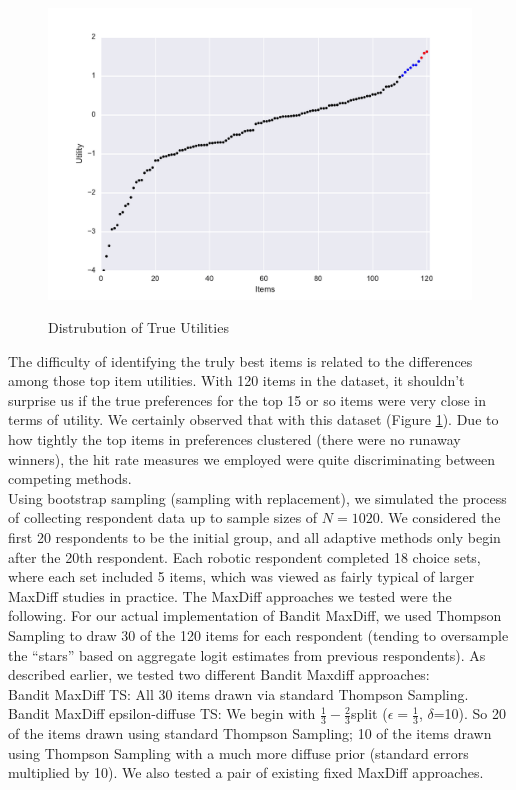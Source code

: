 \documentclass[nonblindrev]{informs3}
\begin{document}
\begin{figure}[!ht]
\caption{Distrubution of True Utilities}
\includegraphics[width=1\textwidth]{plots/utilscore.pdf}
\label{fig:util}
\end{figure}
The difficulty of identifying the truly best items is related to the differences among those top item utilities. With 120 items in the dataset, it shouldn't surprise us if the true preferences for the top 15 or so items were very close in terms of utility.  We certainly observed that with this dataset (Figure \ref{fig:util}).  Due to how tightly the top items in preferences clustered (there were no runaway winners), the hit rate measures we employed were quite discriminating between competing methods.\\
Using bootstrap sampling (sampling with replacement), we simulated the process of collecting respondent data up to sample sizes of $N=1020$.  We considered the first 20 respondents to be the initial group, and all adaptive methods only begin after the 20th respondent. Each robotic respondent completed 18 choice sets, where each set included 5 items, which was viewed as fairly typical of larger MaxDiff studies in practice.
The MaxDiff approaches we tested were the following. For our actual implementation of Bandit MaxDiff, we used Thompson Sampling to draw 30 of the 120 items for each respondent (tending to oversample the ``stars'' based on aggregate logit estimates from previous respondents).  As described earlier, we tested two different Bandit Maxdiff approaches:\\
Bandit MaxDiff TS: All 30 items drawn via standard Thompson Sampling.\\
Bandit MaxDiff epsilon-diffuse TS: We begin with $\frac{1}{3}-\frac{2}{3} $split ($\epsilon=\frac{1}{3}$, $\delta$=10). So 20 of the items drawn using standard Thompson Sampling; 10 of the items drawn using Thompson Sampling with a much more diffuse prior (standard errors multiplied by 10). We also tested a pair of existing fixed MaxDiff approaches.\\
\end{document}
